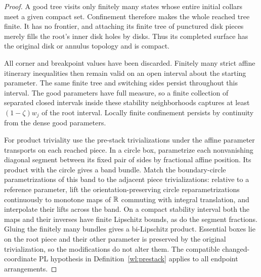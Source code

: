 \begin{proof}
A good tree visits only finitely many states whose entire initial
collars meet a given compact set.  Confinement therefore makes the
whole reached tree finite.  It has no frontier, and attaching its
finite tree of punctured disk pieces merely fills the root's inner
disk holes by disks.  Thus its completed surface has the original
disk or annulus topology and is compact.

All corner and breakpoint values have been discarded.  Finitely
many strict affine itinerary inequalities then remain valid on an
open interval about the starting parameter.  The same finite tree
and switching sides persist throughout this interval.  The good
parameters have full measure, so a finite collection of separated
closed intervals inside these stability neighborhoods captures at
least $(1-\zeta)w_j$ of the root interval.  Locally finite confinement
persists by continuity from the dense good parameters.

For product triviality use the pre-stack trivializations under the
affine parameter transports on each reached piece.  In a circle
box, parametrize each nonvanishing diagonal segment between its
fixed pair of sides by fractional affine position.  Its product
with the circle gives a band bundle.  Match the boundary-circle
parametrizations of this band to the adjacent piece
trivializations: relative to a reference parameter, lift the
orientation-preserving circle reparametrizations continuously to
monotone maps of $\mathbb R$ commuting with integral translation, and
interpolate their lifts across the band.  On a compact stability
interval both the maps and their inverses have finite Lipschitz
bounds, as do the segment fractions.  Gluing the finitely many
bundles gives a bi-Lipschitz product.  Essential boxes lie on the
root piece and their other parameter is preserved by the original
trivialization, so the modifications do not alter them.  The
compatible changed-coordinate PL hypothesis in
Definition~\ref{wl:prestack} applies to all endpoint arrangements.
\end{proof}


